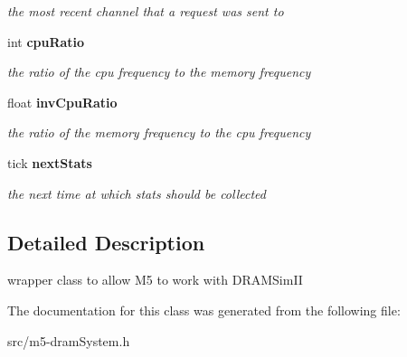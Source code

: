 \begin{CompactItemize}
\begin{CompactList}\small\item\em the most recent channel that a request was sent to \item\end{CompactList}\item 
int {\bf cpuRatio}\label{class_m5dram_system_2fbee1e022242e218e235df762bcd82a}

\begin{CompactList}\small\item\em the ratio of the cpu frequency to the memory frequency \item\end{CompactList}\item 
float {\bf invCpuRatio}\label{class_m5dram_system_1411a566b736381786dc016cd805f323}

\begin{CompactList}\small\item\em the ratio of the memory frequency to the cpu frequency \item\end{CompactList}\item 
tick {\bf nextStats}\label{class_m5dram_system_0a3a89735eec2128ba455c89f689a439}

\begin{CompactList}\small\item\em the next time at which stats should be collected \item\end{CompactList}\end{CompactItemize}


\subsection{Detailed Description}
wrapper class to allow M5 to work with DRAMSimII 

The documentation for this class was generated from the following file:\begin{CompactItemize}
\item 
src/m5-dramSystem.h\end{CompactItemize}

